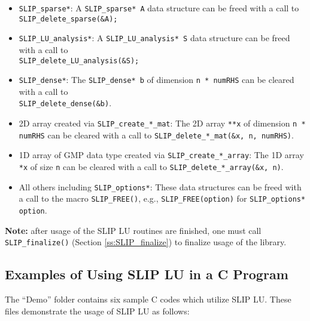 \documentclass[11pt]{article}
\theoremstyle{definition}
\begin{document}
\begin{itemize}
\item \verb|SLIP_sparse*|: A \verb|SLIP_sparse* A| data structure can be freed with a call to \verb|SLIP_delete_sparse(&A);|
\item \verb|SLIP_LU_analysis*|: A \verb|SLIP_LU_analysis* S| data structure can be freed with a call to\\ \verb|SLIP_delete_LU_analysis(&S);|
\item \verb|SLIP_dense*|: The \verb|SLIP_dense* b| of dimension \verb|n * numRHS| can be cleared with a call to \\ \verb|SLIP_delete_dense(&b)|.
\item 2D array created via \verb|SLIP_create_*_mat|: The 2D array \verb|**x| of dimension \verb|n * numRHS| can be cleared with a call to  \verb|SLIP_delete_*_mat(&x, n, numRHS)|.
\item 1D array of GMP data type created via \verb|SLIP_create_*_array|: The 1D array \verb|*x| of size \verb|n| can be cleared with a call to  \verb|SLIP_delete_*_array(&x, n)|.
\item All others including \verb|SLIP_options*|: These data structures can be freed with a call to the macro \verb|SLIP_FREE()|, e.g., \verb|SLIP_FREE(option)| for \verb|SLIP_options* option|.
\end{itemize}

\textbf{Note:} after usage of the SLIP LU routines are finished, one must call \verb|SLIP_finalize()| (Section \ref{ss:SLIP_finalize}) to finalize usage of the library.


\cprotect\subsection{Examples of Using SLIP LU in a C Program} \label{s:Using:Examples}

The ``Demo'' folder contains six sample C codes which utilize SLIP LU. These files demonstrate the usage of SLIP LU as follows:
\end{document}
